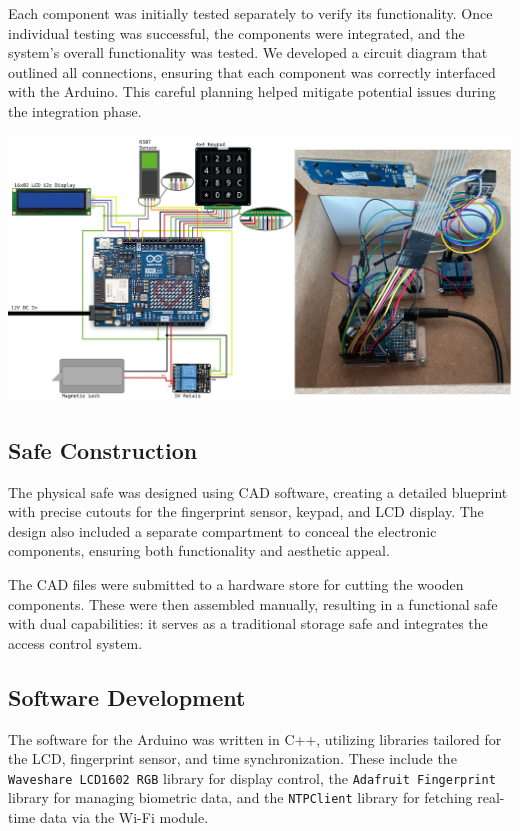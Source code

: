 \documentclass{article}
\begin{document}
Each component was initially tested separately to verify its functionality. Once individual testing was successful, the components were integrated, and the system's overall functionality was tested. We developed a circuit diagram that outlined all connections, ensuring that each component was correctly interfaced with the Arduino. This careful planning helped mitigate potential issues during the integration phase.

    \begin{center}
         \includegraphics[width=1\linewidth]{images/Circuit-Box.png} 
         \captionsetup{hypcap=false}
         \captionsetup{hypcap=true} 
    \end{center}


    

\subsection{Safe Construction}
The physical safe was designed using CAD software, creating a detailed blueprint with precise cutouts for the fingerprint sensor, keypad, and LCD display. The design also included a separate compartment to conceal the electronic components, ensuring both functionality and aesthetic appeal.

The CAD files were submitted to a hardware store for cutting the wooden components. These were then assembled manually, resulting in a functional safe with dual capabilities: it serves as a traditional storage safe and integrates the access control system.

\subsection{Software Development}
The software for the Arduino was written in C++, utilizing libraries tailored for the LCD, fingerprint sensor, and time synchronization. These include the \texttt{Waveshare LCD1602 RGB} library for display control, the \texttt{Adafruit Fingerprint} library for managing biometric data, and the \texttt{NTPClient} library for fetching real-time data via the Wi-Fi module.
\end{document}
